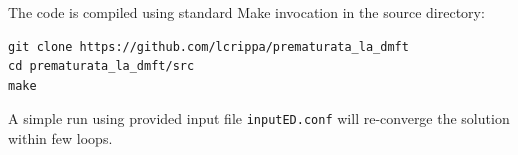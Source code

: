 \documentclass[edipack_sp.tex]{subfiles}
\begin{document}
\begin{appendix}
The code is compiled using standard Make invocation in the source
directory:
\begin{lstlisting}[style=mybash]
git clone https://github.com/lcrippa/prematurata_la_dmft
cd prematurata_la_dmft/src
make
\end{lstlisting}
A simple run using provided input file {\tt inputED.conf} will
re-converge the solution within few loops. 
\end{appendix}
\end{document}
